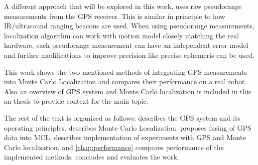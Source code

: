 A different approach that will be explored in this work, uses raw
pseudorange measurements from the GPS receiver.
This is similar in principle to how IR/ultrasound ranging beacons are used.
When using pseudorange measurements, localization algorithm can work with motion model closely
matching the real hardware, each pseudorange measurement can have an
independent error model and further modifications to improve precision like precise
ephemeris can be used.


\vspace{1.5em}


This work shows the two mentioned  methods of integrating GPS measurements
into Monte Carlo Localization and compares their performance on a real robot.
Also an overview of GPS system and Monte Carlo localization is included in
this an thesis to provide context for the main topic.


The rest of the text is organized as follows:
 describes the GPS system and its operating principles.
 describes Monte Carlo Localization.
 proposes fusing of GPS data into MCL.
 describes implementation of experiments with GPS and
Monte Carlo localization,
and \cref{chap:performance} compares performance of the implemented methods.
 concludes and evaluates the work.
